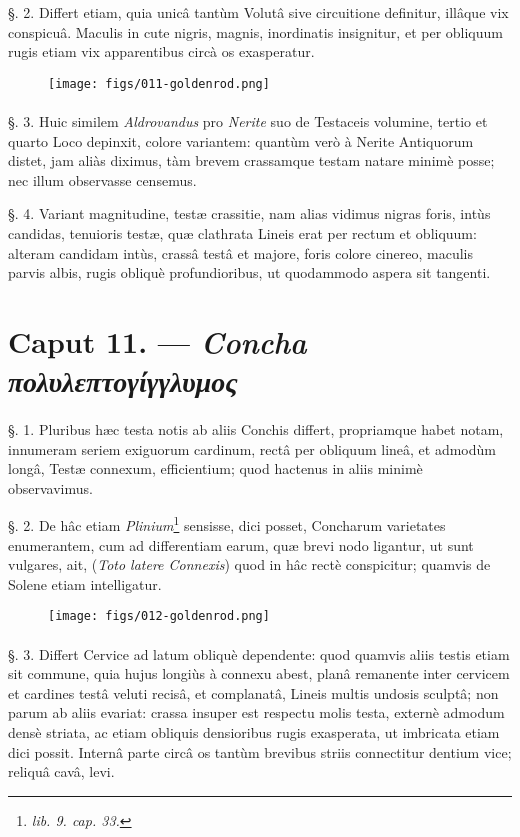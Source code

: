 \documentclass[a4paper, 11pt, oneside, polutonikogreek, german]{article}
\begin{document}
§. 2. Differt etiam, quia unicâ tantùm Volutâ sive circuitione definitur, illâque vix conspicuâ. Maculis in cute nigris, magnis, inordinatis insignitur, et per obliquum rugis etiam vix apparentibus circà os exasperatur.

\begin{figure}[H]
\centering
\texttt{[image: figs/011-goldenrod.png]}

\end{figure}
\paragraph{}
§. 3. Huic similem \emph{Aldrovandus} pro \emph{Nerite} suo de Testaceis volumine, tertio et quarto Loco depinxit, colore variantem: quantùm verò à Nerite Antiquorum distet, jam aliàs diximus, tàm brevem crassamque testam natare minimè posse; nec illum observasse censemus.

§. 4. Variant magnitudine, testæ crassitie, nam alias vidimus nigras foris, intùs candidas, tenuioris testæ, quæ clathrata Lineis erat per rectum et obliquum: alteram candidam intùs, crassâ testâ et majore, foris colore cinereo, maculis parvis albis, rugis obliquè profundioribus, ut quodammodo aspera sit tangenti.

\section{Caput 11. --- \emph{Concha πολυλεπτογίγγλυμος}}
\paragraph{}
§. 1. Pluribus hæc testa notis ab aliis Conchis differt, propriamque habet notam, innumeram seriem exiguorum cardinum, rectâ per obliquum lineâ, et admodùm longâ, Testæ connexum, efficientium; quod hactenus in aliis minimè observavimus.

§. 2. De hâc etiam \emph{Plinium}\footnote{\emph{lib. 9. cap. 33.}} sensisse, dici posset, Concharum varietates enumerantem, cum ad differentiam earum, quæ brevi nodo ligantur, ut sunt vulgares, ait, (\emph{Toto latere Connexis}) quod in hâc rectè conspicitur; quamvis de Solene etiam intelligatur.

\begin{figure}[H]
\centering
\texttt{[image: figs/012-goldenrod.png]}

\end{figure}
\paragraph{}
§. 3. Differt Cervice ad latum obliquè dependente: quod quamvis aliis testis etiam sit commune, quia hujus longiùs à connexu abest, planâ remanente inter cervicem et cardines testâ veluti recisâ, et complanatâ, Lineis multis undosis sculptâ; non parum ab aliis evariat: crassa insuper est respectu molis testa, externè admodum densè striata, ac etiam obliquis densioribus rugis exasperata, ut imbricata etiam dici possit. Internâ parte circâ os tantùm brevibus striis connectitur dentium vice; reliquâ cavâ, levi.
\end{document}
